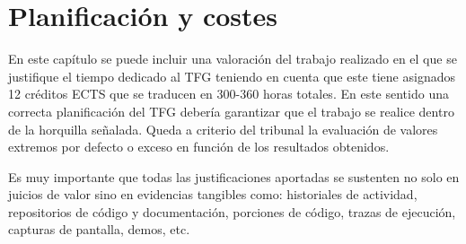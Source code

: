 \section{Planificación y costes}
En este capítulo se puede incluir una valoración del trabajo realizado en el que se justifique el tiempo dedicado al TFG teniendo en cuenta que este tiene asignados 12 créditos ECTS que se traducen en {300-360} horas totales. En este sentido una correcta planificación del TFG debería garantizar que el trabajo se realice dentro de la horquilla señalada. Queda a criterio del tribunal la evaluación de valores extremos por defecto o exceso en función de los resultados obtenidos.

Es muy importante que todas las justificaciones aportadas se sustenten no solo en juicios de valor sino en evidencias tangibles como: historiales de actividad, repositorios de código y documentación, porciones de código, trazas de ejecución, capturas de pantalla, demos, etc.



